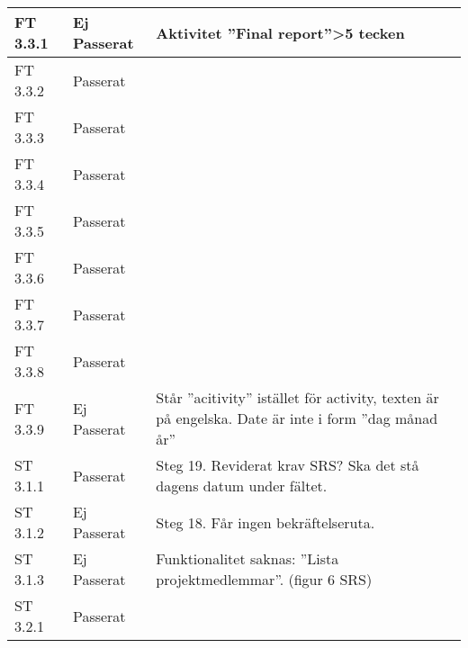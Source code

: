 \documentclass[a4paper]{article}
\begin{document}
\begin{tabular}{| l | l | p{9cm} |}
\hline
FT 3.3.1 & Ej Passerat & Aktivitet ”Final report”>5 tecken \\
\hline
FT 3.3.2 & Passerat & \\
\hline
FT 3.3.3 & Passerat & \\
\hline
FT 3.3.4 & Passerat & \\
\hline
FT 3.3.5 & Passerat & \\
\hline
FT 3.3.6 & Passerat & \\
\hline
FT 3.3.7 & Passerat & \\
\hline
FT 3.3.8 & Passerat & \\
\hline
FT 3.3.9 & Ej Passerat & Står ”acitivity” istället för activity, texten är på engelska. Date är inte i form ”dag månad år” \\
\hline
ST 3.1.1 & Passerat &  Steg 19. Reviderat krav SRS? Ska det stå dagens datum under fältet.\\
\hline
ST 3.1.2 & Ej Passerat & Steg 18. Får ingen bekräftelseruta. \\
\hline
ST 3.1.3 & Ej Passerat & Funktionalitet saknas: ”Lista projektmedlemmar”. (figur 6 SRS) \\
\hline
ST 3.2.1 & Passerat & \\
\hline
\end{tabular}
\end{document}
